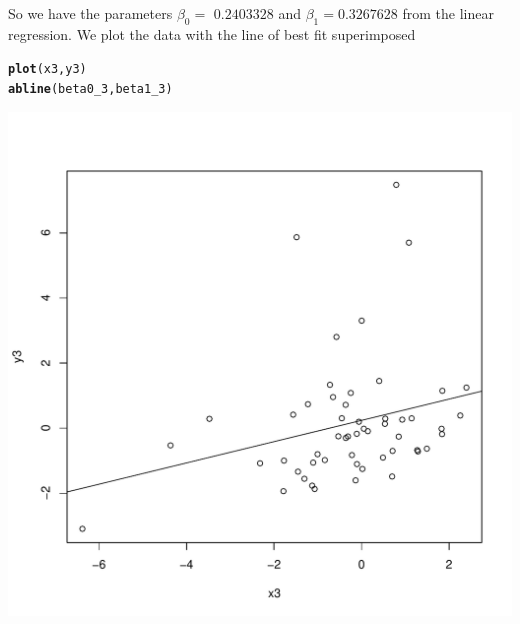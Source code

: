 \documentclass{article}\usepackage[]{graphicx}\usepackage[]{color}
\makeatletter
\def\maxwidth{ %
  \ifdim\Gin@nat@width>\linewidth
    \linewidth
  \else
    \Gin@nat@width
  \fi
}
\newcommand{\hlstd}[1]{\textcolor[rgb]{0.345,0.345,0.345}{#1}}%
\newcommand{\hlkwd}[1]{\textcolor[rgb]{0.737,0.353,0.396}{\textbf{#1}}}%
\newenvironment{kframe}{%
 \def\at@end@of@kframe{}%
 \ifinner\ifhmode%
  \def\at@end@of@kframe{\end{minipage}}%
  \begin{minipage}{\columnwidth}%
 \fi\fi%
 \def\FrameCommand##1{\hskip\@totalleftmargin \hskip-\fboxsep
 \colorbox{shadecolor}{##1}\hskip-\fboxsep
     \hskip-\linewidth \hskip-\@totalleftmargin \hskip\columnwidth}%
 \MakeFramed {\advance\hsize-\width
   \@totalleftmargin\z@ \linewidth\hsize
   \@setminipage}}%
 {\par\unskip\endMakeFramed%
 \at@end@of@kframe}
\newenvironment{knitrout}{}{} %
\makeatother
\begin{document}
So we have the parameters $\beta_0 = $ $0.2403328$ and $\beta_1 = 0.3267628$ from the linear regression. We plot the data with the line of best fit superimposed
\begin{knitrout}
\color{fgcolor}\begin{kframe}
\begin{alltt}
\hlkwd{plot}\hlstd{(x3,y3)}
\hlkwd{abline}\hlstd{(beta0_3, beta1_3)}
\end{alltt}
\end{kframe}
\includegraphics[width=\maxwidth]{figure/unnamed-chunk-7-1} 

\end{knitrout}


\clearpage
\end{document}
